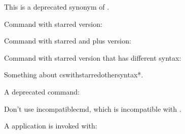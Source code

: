 \documentclass[titlepage=false,oneside,
 fontsize=12pt,captions=tableheading]{scrbook}
\begin{document}

This is a deprecated synonym of
.

Command with starred version:


Command with starred and plus version:


Command with starred version that has different syntax:


Something about \gls{cswithstarredothersyntax*}.

A deprecated command:


Don't use \gls{incompatiblecmd}, which is incompatible with
.

A  application  is invoked with:

\backmatter
\printterms
\printsummary
{}
\printuserguideindex
\end{document}
